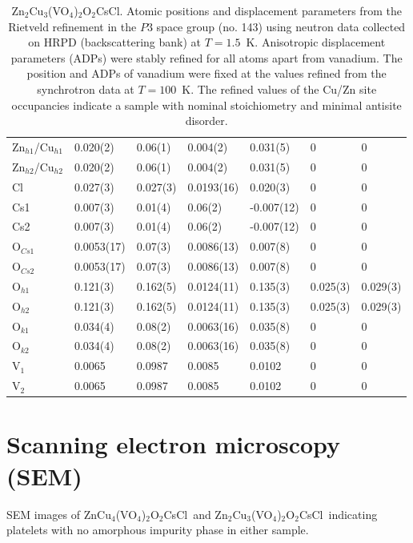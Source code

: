 \documentclass[
sn-mathphys,
Numbered,
onecolumn]
{sn-jnl}%
\newcommand{\znave}{ZnCu$_4$(VO$_4$)$_{2}$O$_2$CsCl}
\newcommand{\zntwoave}{Zn$_2$Cu$_3$(VO$_4$)$_{2}$O$_2$CsCl}
\begin{document}
\begin{table}
\begin{tabular}{ p{2cm} p{1.8cm} p{2cm} p{} p{} p{} p{}}
Zn$_{h1}$/Cu$_{h1}$ & 0.020(2) & 0.06(1) & 0.004(2) & 0.031(5) & 0 & 0 \\
Zn$_{h2}$/Cu$_{h2}$ & 0.020(2) & 0.06(1) & 0.004(2) & 0.031(5) & 0 & 0 \\
Cl & 0.027(3) & 0.027(3) & 0.0193(16) & 0.020(3) & 0 & 0 \\
Cs1 &  0.007(3) & 0.01(4) & 0.06(2) & -0.007(12)  & 0 & 0 \\
Cs2 &  0.007(3) & 0.01(4) & 0.06(2) & -0.007(12)  & 0 & 0 \\
O$_{Cs1}$ & 0.0053(17) & 0.07(3) & 0.0086(13) & 0.007(8) & 0 & 0 \\
O$_{Cs2}$ & 0.0053(17) & 0.07(3) & 0.0086(13) & 0.007(8) & 0 & 0 \\
O$_{h1}$ & 0.121(3) & 0.162(5) & 0.0124(11) & 0.135(3) & 0.025(3) & 0.029(3) \\
O$_{h2}$ &  0.121(3) & 0.162(5) & 0.0124(11) & 0.135(3) & 0.025(3) & 0.029(3) \\
O$_{k1}$ & 0.034(4) & 0.08(2) & 0.0063(16) & 0.035(8) & 0 & 0 \\
O$_{k2}$ & 0.034(4) & 0.08(2) & 0.0063(16) & 0.035(8) & 0 & 0 \\
V$_{1}$ & 0.0065 & 0.0987 & 0.0085 & 0.0102 & 0 & 0  \\
V$_{2}$ & 0.0065 & 0.0987 & 0.0085 & 0.0102 & 0 & 0  
 \\ \hline \hline
   
\end{tabular}
    \caption{\zntwoave. Atomic positions and displacement parameters from the Rietveld refinement in the $P3$ space group (no. 143) using neutron data collected on HRPD (backscattering bank) at $T=1.5$~K. Anisotropic displacement parameters (ADPs) were stably refined for all atoms apart from vanadium. The position and ADPs of vanadium were fixed at the values refined from the synchrotron data at $T=100$~K. The refined values of the Cu/Zn site occupancies indicate a sample with nominal stoichiometry and minimal antisite disorder.}
    \label{Zn2avv_1K_params}

\end{table}

\clearpage
\section{Scanning electron microscopy (SEM)}

SEM images of \znave\ and \zntwoave\ indicating platelets with no amorphous impurity phase in either sample.
\end{document}
